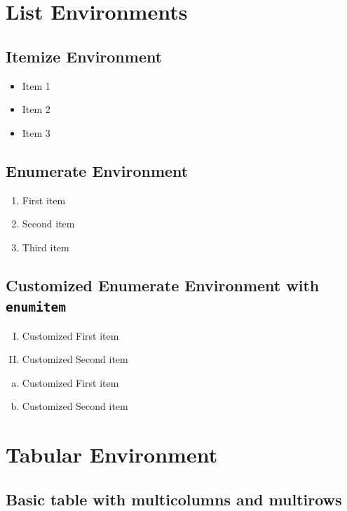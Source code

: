 \section{List Environments}

\subsection{Itemize Environment}

\begin{itemize}
    \item Item 1
    \item Item 2
    \item Item 3
\end{itemize}

\subsection{Enumerate Environment}

\begin{enumerate}
    \item First item
    \item Second item
    \item Third item
\end{enumerate}

\subsection{Customized Enumerate Environment with \texttt{enumitem}}

\begin{enumerate}[(I)]
    \item Customized First item
    \item Customized Second item
\end{enumerate}
\begin{enumerate}[a)]
    \item Customized First item
    \item Customized Second item
\end{enumerate}

\section{Tabular Environment}

\subsection{Basic table with multicolumns and multirows}


